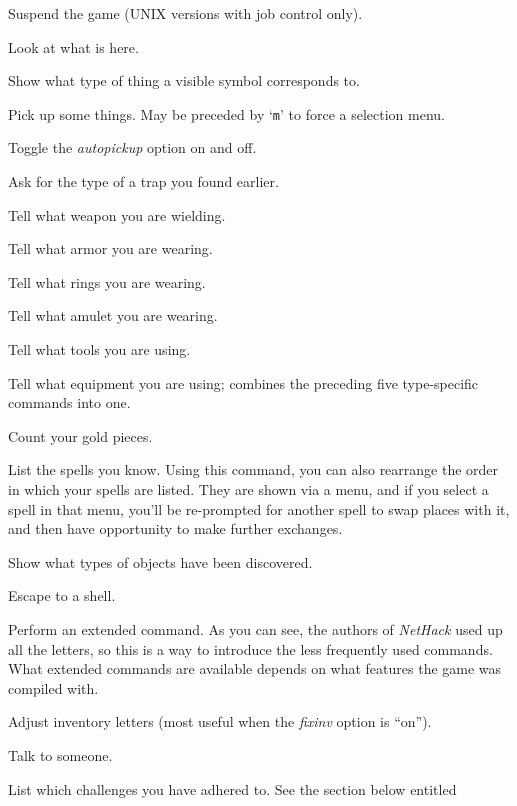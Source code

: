 \item[\tb{\^{}Z}]
Suspend the game (UNIX versions with job control only).
\item[\tb{:}]
Look at what is here.
\item[\tb{;}]
Show what type of thing a visible symbol corresponds to.
\item[\tb{,}]
Pick up some things. May be preceded by `{\tt m}' to force a selection menu.
\item[\tb{@}]
Toggle the {\it autopickup\/} option on and off.
\item[\tb{\^{}}]
Ask for the type of a trap you found earlier.
\item[\tb{)}]
Tell what weapon you are wielding.
\item[\tb{[}]
Tell what armor you are wearing.
\item[\tb{=}]
Tell what rings you are wearing.
\item[\tb{"}]
Tell what amulet you are wearing.
\item[\tb{(}]
Tell what tools you are using.
\item[\tb{*}]
Tell what equipment you are using; combines the preceding five type-specific
commands into one.
\item[\tb{\$}]
Count your gold pieces.
\item[\tb{+}]
List the spells you know.  Using this command, you can also rearrange
the order in which your spells are listed.  They are shown via a menu,
and if you select a spell in that menu, you'll be re-prompted for
another spell to swap places with it, and then have opportunity to
make further exchanges.
\item[\tb{$\backslash$}]
Show what types of objects have been discovered.
\item[\tb{!}]
Escape to a shell.
\item[\tb{\#}]
Perform an extended command.  As you can see, the authors of {\it NetHack\/}
used up all the letters, so this is a way to introduce the less frequently
used commands.
What extended commands are available depends on what features
the game was compiled with.
\item[\tb{\#adjust}]
Adjust inventory letters (most useful when the
{\it fixinv\/}
option is ``on'').
\item[\tb{\#chat}]
Talk to someone.
\item[\tb{\#conduct}]
List which challenges you have adhered to.  See the section below entitled
